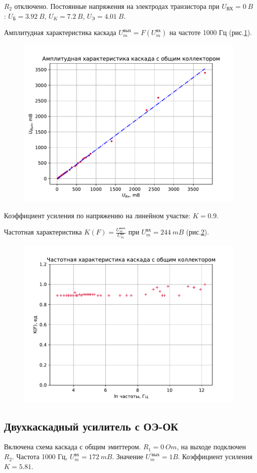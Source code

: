 $R_2$ отключено. Постоянные напряжения на электродах транзистора при $U_{\text{ВХ}}=0 ~B$: $U_{\text{Б}}=3.92 ~B$, $U_K=7.2~ B$, $U_{\text{Э}}=4.01 ~B$.

Амплитудная характеристика каскада $U_m^{\text{вых}}=F(U_m^{\text{вх}})$ на частоте 1000 Гц (рис.\ref{fig:18}).

\begin{figure}[H]
	\centering
	\includegraphics[width=0.7\linewidth]{script/z33}
	\caption{}
	\label{fig:18}
\end{figure}

Коэффициент усиления по напряжению на линейном участке: $K=0.9$.

Частотная характеристика $K(F)=\frac{U_m^{\text{вых}}}{U_m^{\text{вх}}}$ при $U_m^{\text{вх}}= 244 ~mB$ (рис.\ref{fig:19}).

\begin{figure}[H]
	\centering
	\includegraphics[width=0.8\linewidth]{script/z35}
	\caption{}
	\label{fig:19}
\end{figure}

\subsection{Двухкаскадный усилитель с ОЭ-ОК}
Включена схема каскада с общим эмиттером. $R_1=0 ~ Om$, на выходе подключен $R_2$. Частота 1000 Гц, $U_m^{\text{вх}} = 172~ mB$. Значение $U_m^{\text{'вых}} = 1 B$. Коэффициент усиления $K=5.81$.

